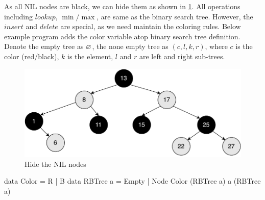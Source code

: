 \documentclass[b5paper]{article}
\begin{document}
As all NIL nodes are black, we can hide them as shown in \cref{fig:rbt-example}. All operations including $lookup$, $\min/\max$, are same as the binary search tree. However, the $insert$ and $delete$ are special, as we need maintain the coloring rules. Below example program adds the color variable atop binary search tree definition. Denote the empty tree as $\varnothing$, the none empty tree as $(c, l, k, r)$, where $c$ is the color (red/black), $k$ is the element, $l$ and $r$ are left and right sub-trees.

\begin{figure}[htbp]
  \centering
  \includegraphics[scale=0.5]{img/rbt-example}
  \caption{Hide the NIL nodes}
  \label{fig:rbt-example}
\end{figure}

\begin{Haskell}
data Color = R | B
data RBTree a = Empty | Node Color (RBTree a) a (RBTree a)
\end{Haskell}

\begin{Exercise}\label{ex:rbt-bounds}
\end{Exercise}
\end{document}
